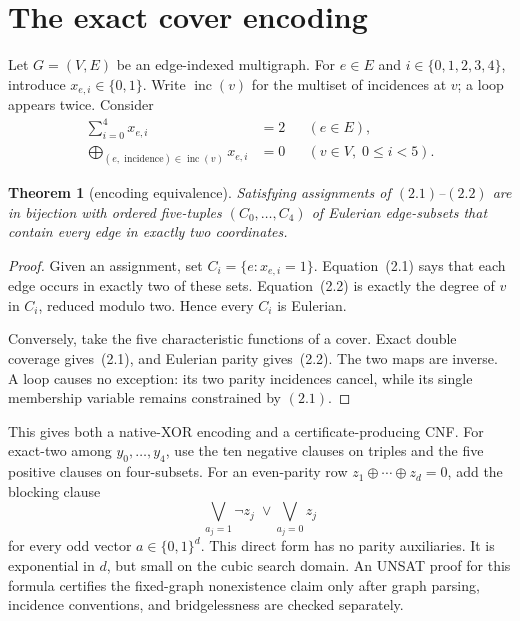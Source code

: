 \documentclass[11pt]{article}
\newtheorem{theorem}{Theorem}[section]
\theoremstyle{definition}
\theoremstyle{remark}
\newcommand{\inc}{\operatorname{inc}}
\newcommand{\1}{\mathbf 1}
\newcommand{\xor}{\mathbin{\oplus}}
\newcommand{\bigxor}{\bigoplus}
\begin{document}
\section{The exact cover encoding}

Let \(G=(V,E)\) be an edge-indexed multigraph.  For \(e\in E\) and
\(i\in\{0,1,2,3,4\}\), introduce \(x_{e,i}\in\{0,1\}\).  Write
\(\inc(v)\) for the multiset of incidences at \(v\); a loop appears twice.
Consider
\begin{align}
 \sum_{i=0}^{4}x_{e,i}&=2
       &&(e\in E),                                      \tag{2.1}\\
 \bigxor_{(e,\text{ incidence})\in\inc(v)}x_{e,i}&=0
       &&(v\in V,\;0\leq i<5).                          \tag{2.2}
\end{align}

\begin{theorem}[encoding equivalence]\label{thm:encoding}
Satisfying assignments of \((2.1)\)--\((2.2)\) are in bijection with
ordered five-tuples \((C_0,\ldots,C_4)\) of Eulerian edge-subsets that
contain every edge in exactly two coordinates.
\end{theorem}

\begin{proof}
Given an assignment, set \(C_i=\{e:x_{e,i}=1\}\).  Equation~(2.1) says
that each edge occurs in exactly two of these sets.  Equation~(2.2) is
exactly the degree of \(v\) in \(C_i\), reduced modulo two.  Hence every
\(C_i\) is Eulerian.

Conversely, take the five characteristic functions of a cover.  Exact
double coverage gives~(2.1), and Eulerian parity gives~(2.2).  The two
maps are inverse.  A loop causes no exception: its two parity incidences
cancel, while its single membership variable remains constrained by
\((2.1)\).
\end{proof}

This gives both a native-XOR encoding and a certificate-producing CNF.
For exact-two among \(y_0,\ldots,y_4\), use the ten negative clauses on
triples and the five positive clauses on four-subsets.  For an even-parity
row \(z_1\xor\cdots\xor z_d=0\), add the blocking clause
\[
 \bigvee_{a_j=1}\neg z_j\;\vee\!
 \bigvee_{a_j=0}z_j
\]
for every odd vector \(a\in\{0,1\}^d\).  This direct form has no parity
auxiliaries.  It is exponential in \(d\), but small on the cubic search
domain.  An UNSAT proof for this formula certifies the fixed-graph
nonexistence claim only after graph parsing, incidence conventions, and
bridgelessness are checked separately.
\end{document}
